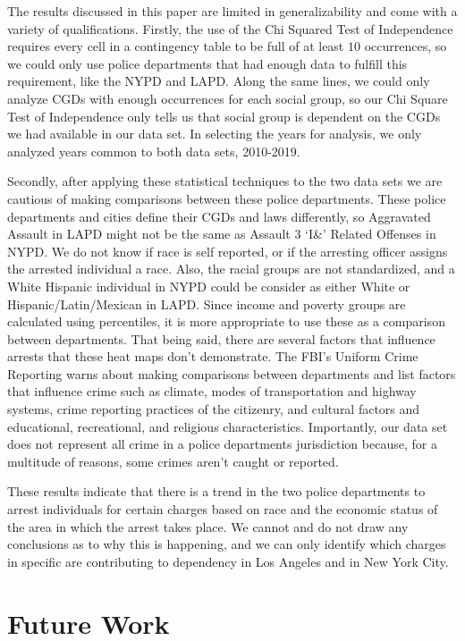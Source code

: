 \documentclass{article}
\begin{document}
The results discussed in this paper are limited in generalizability and come with a variety of qualifications. Firstly, the use of the Chi Squared Test of Independence requires every cell in a contingency table to be full of at least $10$ occurrences, so we could only use police departments that had enough data to fulfill this requirement, like the NYPD and LAPD. Along the same lines, we could only analyze CGDs with enough occurrences for each social group, so our Chi Square Test of Independence only tells us that social group is dependent on the CGDs we had available in our data set. In selecting the years for analysis, we only analyzed years common to both data sets, 2010-2019.

Secondly, after applying these statistical techniques to the two data sets we are cautious of making comparisons between these police departments. These police departments and cities define their CGDs and laws differently, so Aggravated Assault in LAPD might not be the same as Assault 3 `I\&' Related Offenses in NYPD. We do not know if race is self reported, or if the arresting officer assigns the arrested individual a race. Also, the racial groups are not standardized, and a White Hispanic individual in NYPD could be consider as either White or Hispanic/Latin/Mexican in LAPD. Since income and poverty groups are calculated using percentiles, it is more appropriate to use these as a comparison between departments. That being said, there are several factors that influence arrests that these heat maps don't demonstrate. The FBI's Uniform Crime Reporting warns about making comparisons between departments and list factors that influence crime such as climate, modes of transportation and highway systems, crime reporting practices of the citizenry, and cultural factors and educational, recreational, and religious characteristics. \cite{UCR-stats-their-proper-use} Importantly, our data set does not represent all crime in a police departments jurisdiction because, for a multitude of reasons, some crimes aren't caught or reported.


These results indicate that there is a trend in the two police departments to arrest individuals for certain charges based on race and the economic status of the area in which the arrest takes place. We cannot and do not draw any conclusions as to why this is happening, and we can only identify which charges in specific are contributing to dependency in Los Angeles and in New York City.


\section{Future Work}
\end{document}
